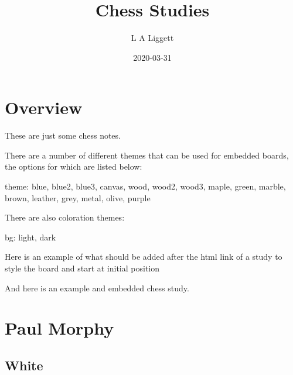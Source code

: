 \documentclass[]{book}
\title{Chess Studies}
\author{L A Liggett}
\date{2020-03-31}
\newenvironment{Shaded}{\begin{snugshade}}{\end{snugshade}}
\newcommand{\CommentTok}[1]{\textcolor[rgb]{0.56,0.35,0.01}{\textit{#1}}}
\newcommand{\NormalTok}[1]{#1}
\newcommand{\OperatorTok}[1]{\textcolor[rgb]{0.81,0.36,0.00}{\textbf{#1}}}
\begin{document}
\maketitle

{
\setcounter{tocdepth}{1}
\tableofcontents
}
\hypertarget{overview}{%
\chapter{Overview}\label{overview}}

These are just some chess notes.

There are a number of different themes that can be used for embedded boards, the options for which are listed below:

\begin{Shaded}
\begin{Highlighting}[]
\NormalTok{theme: blue, blue2, blue3, canvas, wood, wood2, wood3, maple, green, marble, brown, leather, grey, metal, olive, purple}
\end{Highlighting}
\end{Shaded}

There are also coloration themes:

\begin{Shaded}
\begin{Highlighting}[]
\NormalTok{bg: light, dark}
\end{Highlighting}
\end{Shaded}

Here is an example of what should be added after the html link of a study to style the board and start at initial position

\begin{Shaded}
\end{Shaded}

And here is an example and embedded chess study.

\hypertarget{morphy}{%
\chapter{Paul Morphy}\label{morphy}}

\hypertarget{white}{%
\section{White}\label{white}}
\end{document}

